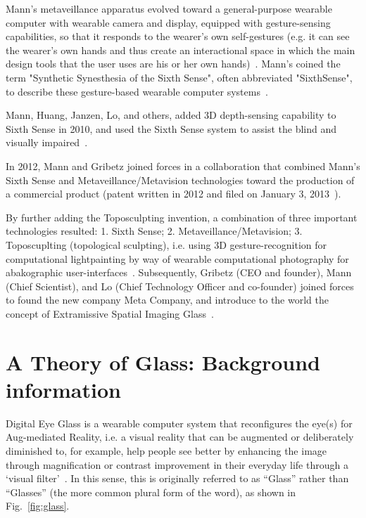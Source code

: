Mann's metaveillance apparatus evolved toward a general-purpose wearable computer with wearable camera and display, equipped with gesture-sensing capabilities, so that it responds to the wearer's own self-gestures (e.g. it can see the wearer's own hands and thus create an interactional space in which the main design tools that the user uses are his or her own hands)~\cite{mannieeecomputer}. Mann's coined the term "Synthetic Synesthesia of the Sixth Sense", often abbreviated "SixthSense", to describe these gesture-based wearable computer systems~\cite{cyborg, geary2002body}.

Mann, Huang, Janzen, Lo, and others, added 3D depth-sensing capability to Sixth Sense in 2010, and used the Sixth Sense system to assist the blind and visually impaired~\cite{mann2011blind}.

In 2012, Mann and Gribetz joined forces in a collaboration that combined Mann's Sixth Sense and Metaveillance/Metavision technologies toward the production of a commercial product (patent written in 2012 and filed on January 3, 2013~\cite{patentmetadepth}).

By further adding the Toposculpting invention, a combination of three important technologies resulted:
1. Sixth Sense;
2. Metaveillance/Metavision;
3. Toposcuplting (topological sculpting), i.e. using 3D gesture-recognition for computational lightpainting by way of wearable computational photography for abakographic user-interfaces~\cite{patentmetabakography}. Subsequently, Gribetz (CEO and founder), Mann (Chief Scientist), and Lo (Chief Technology Officer and co-founder) joined forces to found the new company Meta Company, and introduce to the world the concept of Extramissive Spatial Imaging Glass~\cite{gribetz2014extramissive}. 

\section{A Theory of Glass: Background information}

Digital Eye Glass is a wearable computer system that reconfigures the eye(s)
for Aug-mediated Reality, i.e. a visual reality that can be augmented or
deliberately diminished to, for example, help people see better by enhancing the image through 
magnification or contrast improvement in their everyday life through a `visual 
filter'~\cite{mann1994mediated}. 
In this sense, this is originally referred to as ``Glass'' rather than ``Glasses'' (the more common plural 
form of the word), as shown in Fig.~\ref{fig:glass}. 

